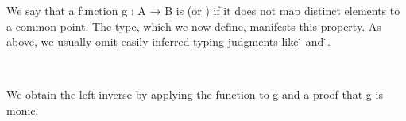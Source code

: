 We say that a function \ab g \as : \ab A \as → \ab B is  (or ) if it does not map distinct elements to a common point. The  type, which we now define, manifests this property.  As above, we usually omit easily inferred typing judgments like  \as{:} \af ̇ and  
\as{:} \af ̇.
\ccpad
\begin{code}%
\>[1]\AgdaSpace{}%
\AgdaSymbol{:}\AgdaSpace{}%
\AgdaSymbol{(}\AgdaSpace{}%
\AgdaSymbol{:}\AgdaSpace{}%
\AgdaSpace{}%
\AgdaSpace{}%
\AgdaSymbol{)}\AgdaSpace{}%
\AgdaSpace{}%
\AgdaSpace{}%
\AgdaSpace{}%
\AgdaSpace{}%
\<%
\\
%
\>[1]\AgdaSpace{}%
\AgdaSpace{}%
\AgdaSymbol{=}\AgdaSpace{}%
\AgdaSpace{}%
\AgdaSpace{}%
\AgdaSpace{}%
\AgdaSpace{}%
\AgdaSpace{}%
\AgdaSpace{}%
\AgdaSpace{}%
\AgdaSpace{}%
\AgdaSpace{}%
\AgdaSpace{}%
\AgdaSpace{}%
\AgdaSpace{}%
\<%
\end{code}
\ccpad
We obtain the left-inverse by applying the function  to \ab g and a proof that \ab g is monic.
\ccpad
\begin{code}%
\>[1]\AgdaSpace{}%
\AgdaSymbol{:}\AgdaSpace{}%
\AgdaSymbol{(}\AgdaSpace{}%
\AgdaSymbol{:}\AgdaSpace{}%
\AgdaSpace{}%
\AgdaSpace{}%
\AgdaSymbol{)}\AgdaSpace{}%
\AgdaSpace{}%
\AgdaSpace{}%
\AgdaSpace{}%
\AgdaSpace{}%
\AgdaSymbol{(}\AgdaSpace{}%
\AgdaSymbol{:}\AgdaSpace{}%
\AgdaSymbol{)}\AgdaSpace{}%
\AgdaSpace{}%
\AgdaSpace{}%
\AgdaSpace{}%
\AgdaSpace{}%
\AgdaSpace{}%
\AgdaSpace{}%
\<%
\\
%
\>[1]\AgdaSpace{}%
\AgdaSpace{}%
\AgdaSymbol{\AgdaUnderscore{}}\AgdaSpace{}%
\AgdaSymbol{=}\AgdaSpace{}%
\AgdaSpace{}%
\AgdaSpace{}%
\AgdaSpace{}%
\AgdaSpace{}%
\AgdaSpace{}%
\AgdaSpace{}%
\<%
\end{code}
